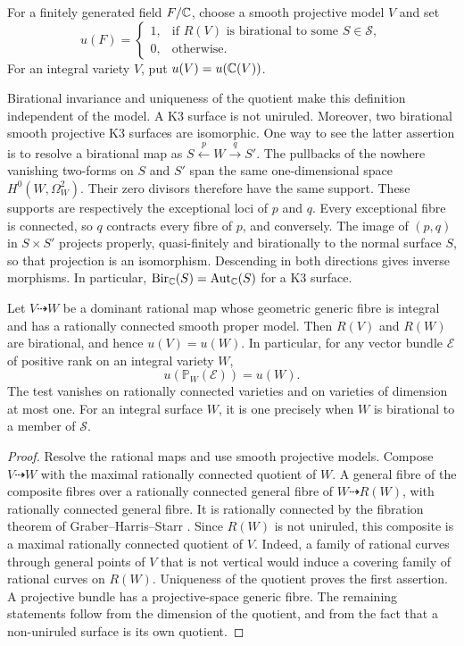 \begin{definition}\label{pre:test}
For a finitely generated field $F/\mathbb C$, choose a smooth projective model
$V$ and set
\[
 u(F)=
 \begin{cases}
  1,&\text{if }R(V)\text{ is birational to some }S\in\mathcal S,\\
  0,&\text{otherwise}.
 \end{cases}
\]
For an integral variety $V$, put $u(V)=u(\mathbb C(V))$.
\end{definition}

Birational invariance and uniqueness of the quotient make this definition
independent of the model. A K3 surface is not uniruled. Moreover, two
birational smooth projective K3 surfaces are isomorphic. One way to see
the latter assertion is to resolve a birational map as
$S\xleftarrow{p}W\xrightarrow{q}S'$. The pullbacks of the nowhere
vanishing two-forms on $S$ and $S'$ span the same one-dimensional space
$H^0(W,\Omega_W^2)$. Their zero divisors therefore have the same support.
These supports are respectively the exceptional loci of $p$ and $q$.
Every exceptional fibre is connected, so $q$ contracts every fibre of
$p$, and conversely. The image of $(p,q)$ in $S\times S'$ projects
properly, quasi-finitely and birationally to the normal surface $S$,
so that projection is an isomorphism.
Descending in both directions gives inverse morphisms. In particular,
$\operatorname{Bir}_{\mathbb C}(S)=\operatorname{Aut}_{\mathbb C}(S)$ for a K3 surface.

\begin{lemma}\label{pre:mrc-fibration}
Let $V\dashrightarrow W$ be a dominant rational map whose geometric
generic fibre is integral and has a rationally connected smooth proper
model. Then $R(V)$ and $R(W)$ are birational, and hence $u(V)=u(W)$.
In particular, for any vector bundle $\mathcal E$ of positive rank on
an integral variety $W$,
\[
 u(\mathbb P_W(\mathcal E))=u(W).
\]
The test vanishes on rationally connected varieties and on varieties
of dimension at most one. For an integral surface $W$, it is one
precisely when $W$ is birational to a member of $\mathcal S$.
\end{lemma}

\begin{proof}
Resolve the rational maps and use smooth projective models.
Compose $V\dashrightarrow W$ with the maximal rationally connected
quotient of $W$. A general fibre of the composite fibres over a
rationally connected general fibre of $W\dashrightarrow R(W)$, with
rationally connected general fibre. It is rationally connected by the
fibration theorem of Graber--Harris--Starr
\cite[Corollary~1.3]{GHS03}. Since $R(W)$
is not uniruled, this composite is a maximal rationally connected
quotient of $V$. Indeed, a family of rational curves through general
points of $V$ that is not vertical would induce a covering family of
rational curves on $R(W)$. Uniqueness of the quotient proves the first
assertion. A projective bundle has a projective-space generic fibre.
The remaining statements follow from the dimension of the quotient,
and from the fact that a non-uniruled surface is its own quotient.
\end{proof}

